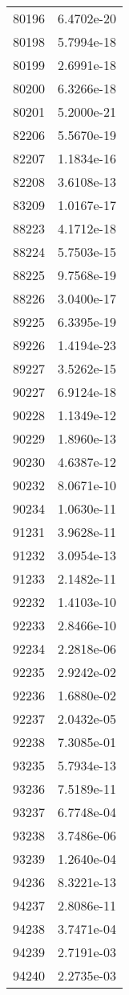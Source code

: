 \begin{table}[h!]
\begin{tabular}{|| c || c |}
80196 & 6.4702e-20 \\
80198 & 5.7994e-18 \\
80199 & 2.6991e-18 \\
80200 & 6.3266e-18 \\
80201 & 5.2000e-21 \\
82206 & 5.5670e-19 \\
82207 & 1.1834e-16 \\
82208 & 3.6108e-13 \\
83209 & 1.0167e-17 \\
88223 & 4.1712e-18 \\
88224 & 5.7503e-15 \\
88225 & 9.7568e-19 \\
88226 & 3.0400e-17 \\
89225 & 6.3395e-19 \\
89226 & 1.4194e-23 \\
89227 & 3.5262e-15 \\
90227 & 6.9124e-18 \\
90228 & 1.1349e-12 \\
90229 & 1.8960e-13 \\
90230 & 4.6387e-12 \\
90232 & 8.0671e-10 \\
90234 & 1.0630e-11 \\
91231 & 3.9628e-11 \\
91232 & 3.0954e-13 \\
91233 & 2.1482e-11 \\
92232 & 1.4103e-10 \\
92233 & 2.8466e-10 \\
92234 & 2.2818e-06 \\
92235 & 2.9242e-02 \\
92236 & 1.6880e-02 \\
92237 & 2.0432e-05 \\
92238 & 7.3085e-01 \\
93235 & 5.7934e-13 \\
93236 & 7.5189e-11 \\
93237 & 6.7748e-04 \\
93238 & 3.7486e-06 \\
93239 & 1.2640e-04 \\
94236 & 8.3221e-13 \\
94237 & 2.8086e-11 \\
94238 & 3.7471e-04 \\
94239 & 2.7191e-03 \\
94240 & 2.2735e-03 \\

\end{tabular}
\end{table}
